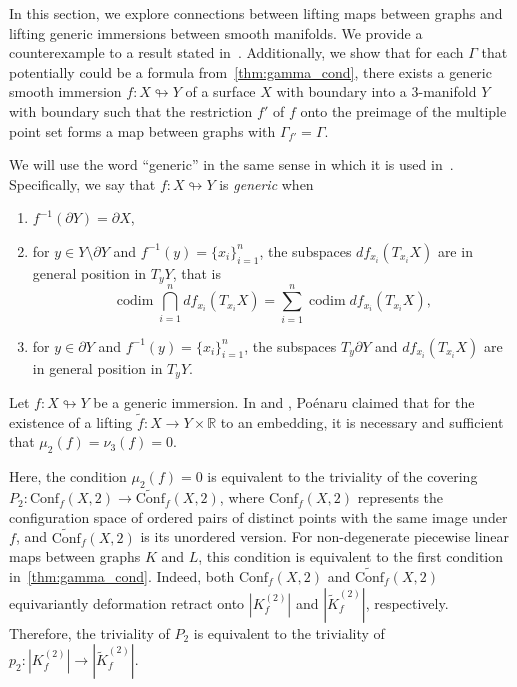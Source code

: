 \documentclass[a4paper,12pt,reqno,oneside]{amsart}
\theoremstyle{plain}
\theoremstyle{definition}
\theoremstyle{plain}
\newcommand{\from}{\colon}
\newcommand{\wt}[1]{\widetilde{#1}}
\newcommand{\Conf}{\mathrm{Conf}}
\newcommand{\R}{\mathbb{R}}
\DeclareMathOperator{\codim}{codim}
\begin{document}
In this section, we explore connections between lifting maps between graphs and lifting generic
immersions between smooth manifolds. We provide a counterexample to a result stated
in~\cite{poen,poen_fr}. Additionally, we show that for each $\Gamma$ that potentially could be a
formula from~\cref{thm:gamma_cond}, there exists a generic smooth immersion
$f \from X \looparrowright Y$ of a surface $X$ with boundary into a 3-manifold $Y$ with boundary
such that the restriction $f'$ of $f$ onto the preimage of the multiple point set forms a map
between graphs with $\Gamma_{f'} = \Gamma$.

We will use the word ``generic'' in the same sense in which it is used in~\cite{poen}. Specifically,
we say that $f \from X \looparrowright Y$ is \emph{generic} when
\begin{enumerate}
\item $f^{-1}(\partial Y) = \partial X$,
\item for $y \in Y \setminus \partial Y$ and $f^{-1}(y) = \{x_i\}_{i=1}^{n}$, the subspaces
  $df_{x_i}(T_{x_i}X)$ are in general position in $T_y Y$, that is
  \[
  \codim \bigcap_{i=1}^{n} df_{x_i}(T_{x_i}X) = \sum_{i=1}^{n} \codim df_{x_i}(T_{x_i}X),
  \]
\item for $y \in \partial Y$ and $f^{-1}(y) = \{x_i\}_{i=1}^{n}$, the subspaces $T_y \partial Y$ and
  $df_{x_i}(T_{x_i} X)$ are in general position in $T_y Y$.
\end{enumerate}

Let $f \from X \looparrowright Y$ be a generic immersion. In \cite{poen} and \cite[Th\'{e}or\`{e}me
1]{poen_fr}, Po\'{e}naru claimed that for the existence of a lifting $\wt{f} \from X \to Y \times
\R$ to an embedding, it is necessary and sufficient that $\mu_2(f) = \nu_3(f) = 0$.

Here, the condition $\mu_2(f) = 0$ is equivalent to the triviality of the covering
$P_2 \from \Conf_f(X, 2) \to \wt{\Conf}_f(X, 2)$, where $\Conf_f(X, 2)$ represents the configuration
space of ordered pairs of distinct points with the same image under $f$, and $\wt\Conf_f(X, 2)$ is
its unordered version. For non-degenerate piecewise linear maps between graphs $K$ and $L$, this
condition is equivalent to the first condition in~\cref{thm:gamma_cond}. Indeed, both
$\Conf_f(X, 2)$ and $\wt\Conf_f(X, 2)$ equivariantly deformation retract onto $|K^{(2)}_f|$ and
$|\wt{K}^{(2)}_f|$, respectively. Therefore, the triviality of $P_2$ is equivalent to the triviality
of $p_2 \from |K^{(2)}_f| \to |\wt{K}^{(2)}_f|$.
\end{document}

